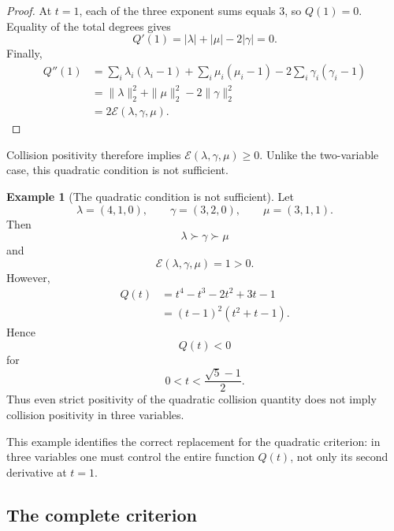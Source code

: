 \documentclass[11pt]{article}
\theoremstyle{definition}
\newtheorem{example}[theorem]{Example}
\newcommand{\Energy}{\mathcal E}
\begin{document}
\begin{proof}
At \(t=1\), each of the three exponent sums equals \(3\), so \(Q(1)=0\).  Equality of the total degrees gives
\begin{equation*}
Q'(1)=|\lambda|+|\mu|-2|\gamma|=0.
\end{equation*}
Finally,
\begin{align*}
Q''(1)
&=\sum_i\lambda_i(\lambda_i-1)
 +\sum_i\mu_i(\mu_i-1)
 -2\sum_i\gamma_i(\gamma_i-1)\\
&=\|\lambda\|_2^2+\|\mu\|_2^2-2\|\gamma\|_2^2\\
&=2\Energy(\lambda,\gamma,\mu).
\end{align*}
\end{proof}

Collision positivity therefore implies \(\Energy(\lambda,\gamma,\mu)\ge0\).  Unlike the two-variable case, this quadratic condition is not sufficient.

\begin{example}[The quadratic condition is not sufficient]\label{ex:quadratic-not-sufficient}
Let
\begin{equation*}
\lambda=(4,1,0),
\qquad
\gamma=(3,2,0),
\qquad
\mu=(3,1,1).
\end{equation*}
Then
\begin{equation*}
\lambda\succ\gamma\succ\mu
\end{equation*}
and
\begin{equation*}
\Energy(\lambda,\gamma,\mu)=1>0.
\end{equation*}
However,
\begin{align*}
Q(t)
&=t^4-t^3-2t^2+3t-1\\
&=(t-1)^2(t^2+t-1).
\end{align*}
Hence
\begin{equation*}
Q(t)<0
\end{equation*}
for
\begin{equation*}
0<t<\frac{\sqrt5-1}{2}.
\end{equation*}
Thus even strict positivity of the quadratic collision quantity does not imply collision positivity in three variables.
\end{example}

This example identifies the correct replacement for the quadratic criterion: in three variables one must control the entire function \(Q(t)\), not only its second derivative at \(t=1\).

\subsection{The complete criterion}
\end{document}
